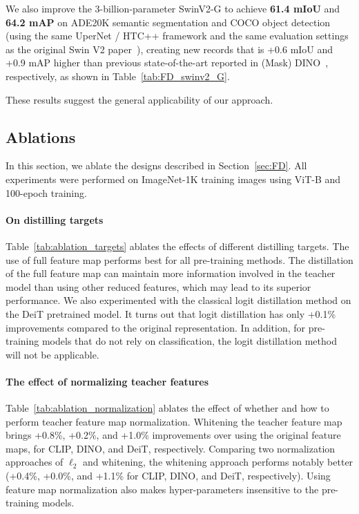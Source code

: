 \documentclass{article}
\begin{document}
We also improve the 3-billion-parameter SwinV2-G to achieve \textbf{61.4 mIoU} and \textbf{64.2 mAP} on ADE20K semantic segmentation and COCO object detection (using the same UperNet / HTC++ framework and the same evaluation settings as the original Swin V2 paper~\cite{swinv2}), creating new records that is +0.6 mIoU and +0.9 mAP higher than previous state-of-the-art reported in (Mask) DINO~\cite{zhang2022dino,li2022mask}, respectively, as shown in Table~\ref{tab:FD_swinv2_G}.

These results suggest the general applicability of our approach.

\subsection{Ablations}

In this section, we ablate the designs described in Section~\ref{sec:FD}. All experiments were performed on ImageNet-1K training images using ViT-B and 100-epoch training.

\paragraph{On distilling targets} Table~\ref{tab:ablation_targets} ablates the effects of different distilling targets. The use of full feature map performs best for all pre-training methods. The distillation of the full feature map can maintain more information involved in the teacher model than using other reduced features, which may lead to its superior performance. We also experimented with the classical logit distillation method on the DeiT pretrained model. It turns out that logit distillation has only +0.1\% improvements compared to the original representation. In addition, for pre-training models that do not rely on classification, the logit distillation method will not be applicable.

\paragraph{The effect of normalizing teacher features} Table~\ref{tab:ablation_normalization} ablates the effect of whether and how to perform teacher feature map normalization. Whitening the teacher feature map brings +0.8\%, +0.2\%, and +1.0\% improvements over using the original feature maps, for CLIP, DINO, and DeiT, respectively. Comparing two normalization approaches of $\ell_2$ and whitening, the whitening approach performs notably better (+0.4\%, +0.0\%, and +1.1\% for CLIP, DINO, and DeiT, respectively). Using feature map normalization also makes hyper-parameters insensitive to the pre-training models.
\end{document}
